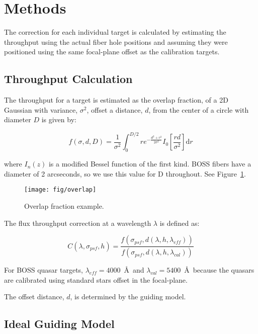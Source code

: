 \documentclass[preprint2]{aastex}
\providecommand{\fig}[1]{Figure~\ref{fig:#1}}
\begin{document}
\section{Methods}

The correction for each individual target is calculated by estimating the throughput using the actual fiber hole positions and assuming they were positioned using the same focal-plane offset as the calibration targets.

\subsection{Throughput Calculation}

The throughput for a target is estimated as the overlap fraction, of a 2D Gaussian with variance, $\sigma^2$, offset a distance, $d$, from the center of a circle with diameter $D$ is given by:

\begin{equation}
\label{eq:overlap}
f(\sigma,d,D) = \frac{1}{\sigma ^2}\int_{0}^{D/2}  r e^{-\frac{d^2+r^2}{2 \sigma ^2}} I_{0}\left[\frac{r d}{\sigma ^2}\right] \mathrm{d}r
\end{equation}

where $I_n(z)$ is a modified Bessel function of the first kind. BOSS fibers have a diameter of 2 arcseconds, so we use this value for D throughout. See \fig{overlap}.

\begin{figure}
\centering
\texttt{[image: fig/overlap]}
\caption{Overlap fraction example.}
\label{fig:overlap}
\end{figure}

The flux throughput correction at a wavelength $\lambda$ is defined as:

\begin{equation}
\label{}
C(\lambda,\sigma_{psf},h) = \frac{f(\sigma_{psf},d(\lambda,h,\lambda_{eff}))}{f(\sigma_{psf},d(\lambda,h,\lambda_{cal}))}
\end{equation}

For BOSS quasar targets, $\lambda_{eff} = 4000$~\AA~and $\lambda_{cal} = 5400$~\AA~because the quasars are calibrated using standard stars offset in the focal-plane. 

The offset distance, $d$, is determined by the guiding model.

\subsection{Ideal Guiding Model}
\end{document}
